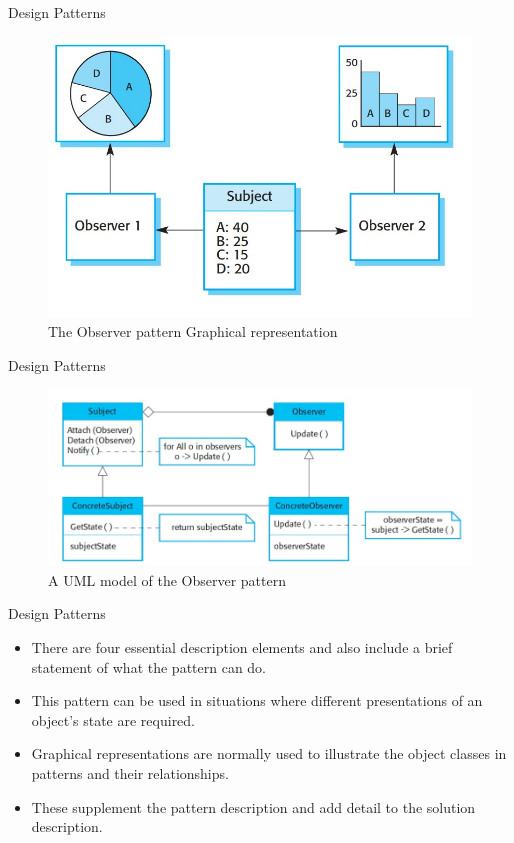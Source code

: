 \documentclass{beamer}
\begin{document}
\begin{frame}{Design Patterns}
	\begin{figure}
		\includegraphics[scale=.5]{img/m3_10}
		\caption{The Observer pattern Graphical representation}
	\end{figure}
	
\end{frame}
\begin{frame}{Design Patterns}
	\begin{figure}
		\includegraphics[scale=.5]{img/m3_12}
		\caption{A UML model of the Observer pattern}
	\end{figure}

\end{frame}

\begin{frame}{Design Patterns}
	\begin{itemize}
		\item There are four essential description elements and
		also include a brief statement of what the pattern can do.
		\item This pattern can be used in situations 
		where different presentations of an object’s state are required.
		\item Graphical representations are normally used to illustrate the object classes in patterns and their 
		relationships. 
		\item These supplement the pattern description and add detail to the solution 
		description.
	\end{itemize}
\end{frame}
\end{document}
